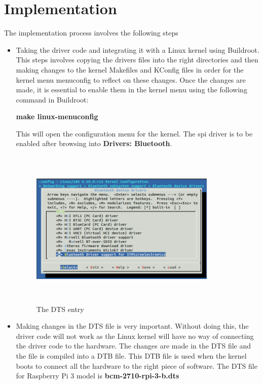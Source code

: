 \section{Implementation}
The implementation process involves the following steps
\begin{itemize}
	\item Taking the driver code and integrating it with a Linux kernel using Buildroot. This steps involves copying the drivers files into the right directories and then making changes to the kernel Makefiles and KConfig files in order for the kernel menu menuconfig to reflect on these changes. Once the changes are made, it is essential to enable them in the kernel menu using the following command in Buildroot:
	\begin{center}
		\textbf{make linux-menuconfig}\\
	\end{center}
	This will open the configuration menu for the kernel. The spi driver is to be enabled after browsing into \textbf{Drivers: Bluetooth}.
	\begin{figure}[ht]
		\centering
		\includegraphics[width=3.5in, height=3in]{images/menu_implementation.png}
		\caption{The DTS entry}
	\end{figure}
	\item Making changes in the DTS file is very important. Without doing this, the driver code will not work as the Linux kernel will have no way of connecting the driver code to the hardware. The changes are made in the DTS file and the file is compiled into a DTB file. This DTB file is used when the kernel boots to connect all the hardware to the right piece of software. The DTS file for Raspberry Pi 3 model is \textbf{bcm-2710-rpi-3-b.dts}
	\begin{figure}[ht]
		\centering

\end{figure}
\end{itemize}
